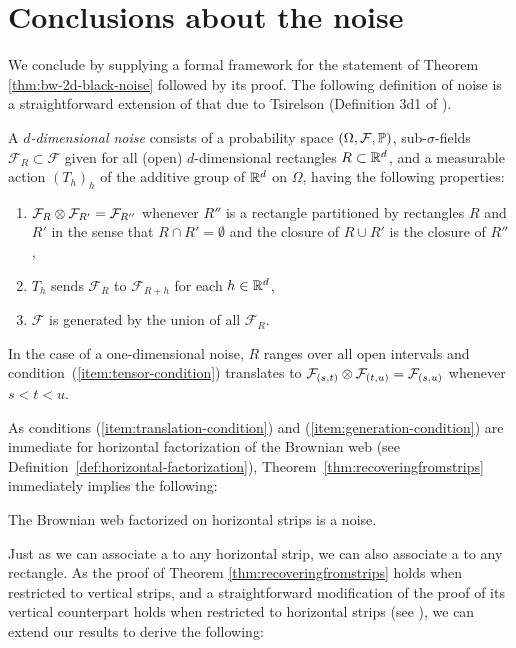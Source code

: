 {
\section{Conclusions about the noise}
\label{sec:conclusions-about-the-noise}

We conclude by supplying a formal framework for the statement of
Theorem \ref{thm:bw-2d-black-noise} followed by its proof.
The following definition of noise is a straightforward extension of
that due to Tsirelson (Definition
3d1 of \cite{tsirelson-nonclassical-stochastic-flows}).

\newcommand{\F}{\mathcal{F}}
A \emph{$d$-dimensional noise} consists of a probability space $(\Omega,\F,
\P)$, sub-$\sigma$-fields $\F_R \subset \F$ given for all (open)
$d$-dimensional rectangles $R \subset \mathbb{R}^d$, and a measurable action
$(T_h)_h$ of the additive group of $\mathbb{R}^d$ on $\Omega$, having the following properties:

\begin{enumerate}
\item \label{item:tensor-condition} $\F_R \tensor \F_{R'} = \F_{R''}$ whenever $R''$ is a
rectangle partitioned by rectangles $R$ and $R'$ in the sense that
$R\cap R'=\emptyset$ and the closure of $R \cup R'$
is the closure of $R''$,
\item \label{item:translation-condition} $T_h$ sends $\F_R$ to $\F_{R+h}$ for each $h \in \mathbb{R}^d$,
\item \label{item:generation-condition} $\F$ is generated by the union of all $\F_R$.
\end{enumerate}

In the case of a one-dimensional noise, $R$ ranges over all open intervals
and condition~(\ref{item:tensor-condition}) translates to
$\F_{(s,t)} \tensor \F_{(t,u)} = \F_{(s,u)}$ whenever $s < t < u$.


As conditions (\ref{item:translation-condition}) and
(\ref{item:generation-condition}) are immediate for
horizontal factorization of the Brownian web (see
Definition~\ref{def:horizontal-factorization}),
Theorem~\ref{thm:recoveringfromstrips} immediately
implies the following:

\begin{proposition*}
The Brownian web factorized on horizontal strips is a noise.
\end{proposition*}

Just as we can associate a \sigfield{} to any horizontal strip, we can
also associate a \sigfield{} to any rectangle.
As the proof of Theorem \ref{thm:recoveringfromstrips}
holds when restricted to vertical strips, and a straightforward
modification of the proof of its vertical
counterpart holds when restricted to horizontal strips
(see \cite{tsirelson-scaling-limit-noise-stability}),
we can extend our results to derive the following:

}
